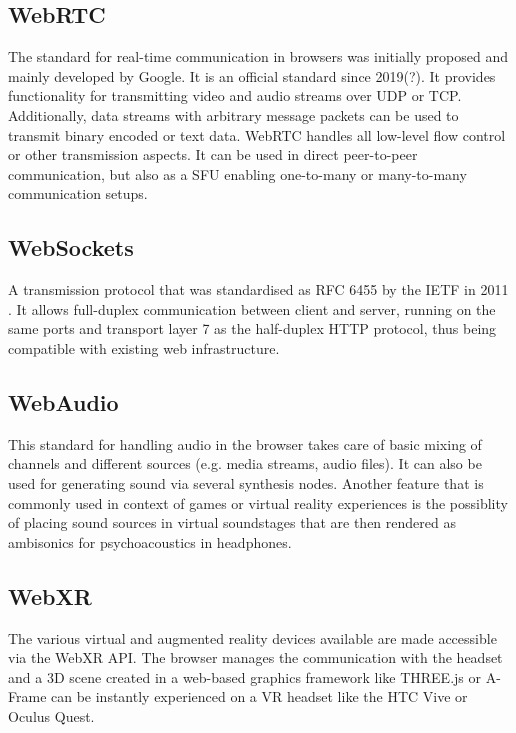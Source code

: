 \subsection{WebRTC}

The standard for real-time communication in browsers was initially proposed and mainly developed by Google. It is an official standard since 2019(?). It provides functionality for transmitting video and audio streams over \ac{UDP} or \ac{TCP}. Additionally, data streams with arbitrary message packets can be used to transmit binary encoded or text data. WebRTC handles all low-level flow control or other transmission aspects. It can be used in direct peer-to-peer communication, but also as a \ac{SFU} enabling one-to-many or many-to-many communication setups.

\subsection{WebSockets}

A transmission protocol that was standardised as \ac{RFC} 6455 by the \ac{IETF} in 2011 \parencite{webSocketsProtocolRfc}. It allows full-duplex communication between client and server, running on the same ports and transport layer 7 as the half-duplex \ac{HTTP} protocol, thus being compatible with existing web infrastructure.

\subsection{WebAudio}

This standard for handling audio in the browser takes care of basic mixing of channels and different sources (e.g. media streams, audio files). It can also be used for generating sound via several synthesis nodes. Another feature that is commonly used in context of games or virtual reality experiences is the possiblity of placing sound sources in virtual soundstages that are then rendered as ambisonics for psychoacoustics in headphones.

\subsection{WebXR}

The various virtual and augmented reality devices available are made accessible via the WebXR \ac{API}. The browser manages the communication with the headset and a \ac{3D} scene created in a web-based graphics framework like THREE.js or A-Frame can be instantly experienced on a \ac{VR} headset like the HTC Vive or Oculus Quest.

